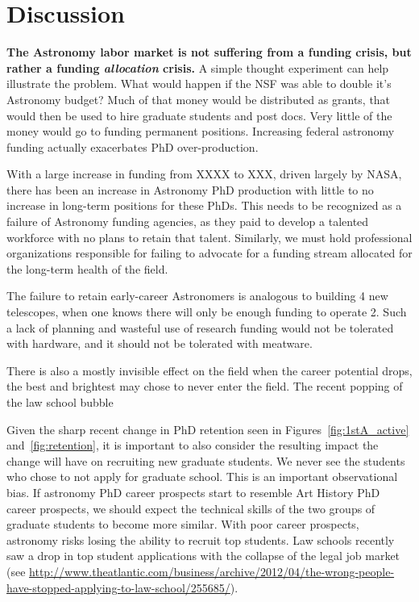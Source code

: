 \documentclass{emulateapj}
\begin{document}
\section{Discussion}

{\bf{The Astronomy labor market is not suffering from a funding crisis, but rather a funding {\emph{allocation}} crisis.}} A simple thought experiment can help illustrate the problem. What would happen if the NSF was able to double it's Astronomy budget? Much of that money would be distributed as grants, that would then be used to hire graduate students and post docs. Very little of the money would go to funding permanent positions. Increasing federal astronomy funding actually exacerbates PhD over-production. 

With a large increase in funding from XXXX to XXX, driven largely by NASA, there has been an increase in Astronomy PhD production with little to no increase in long-term positions for these PhDs.  This needs to be recognized as a failure of Astronomy funding agencies, as they paid to develop a talented workforce with no plans to retain that talent. Similarly, we must hold professional organizations responsible for failing to advocate for a funding stream allocated for the long-term health of the field.  

The failure to retain early-career Astronomers is analogous to building 4 new telescopes, when one knows there will only be enough funding to operate 2.  Such a lack of planning and wasteful use of research funding would not be tolerated with hardware, and it should not be tolerated with meatware. 

There is also a mostly invisible effect on the field when the career potential drops, the best and brightest may chose to never enter the field.  The recent popping of the law school bubble %


Given the sharp recent change in PhD retention seen in Figures~\ref{fig:1stA_active} and~\ref{fig:retention}, it is important to also consider the resulting impact the change will have on recruiting new graduate students. We never see the students who chose to not apply for graduate school. This is an important observational bias.  If astronomy PhD career prospects start to resemble Art History PhD career prospects, we should expect the technical skills of the two groups of graduate students to become more similar.  With poor career prospects, astronomy risks losing the ability to recruit top students. Law schools recently saw a drop in top student applications with the collapse of the legal job market (see \url{http://www.theatlantic.com/business/archive/2012/04/the-wrong-people-have-stopped-applying-to-law-school/255685/}).  
\end{document}
